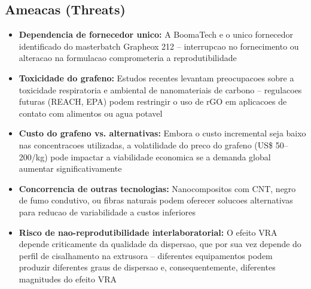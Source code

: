 \documentclass[11pt,a4paper,oneside]{article}
\begin{document}
\subsection{Ameacas (Threats)}
\begin{itemize}[nosep]
    \item {\bfseries Dependencia de fornecedor unico:} A BoomaTech e o unico fornecedor identificado do masterbatch Grapheox 212 -- interrupcao no fornecimento ou alteracao na formulacao comprometeria a reprodutibilidade
    \item {\bfseries Toxicidade do grafeno:} Estudos recentes levantam preocupacoes sobre a toxicidade respiratoria e ambiental de nanomateriais de carbono -- regulacoes futuras (REACH, EPA) podem restringir o uso de rGO em aplicacoes de contato com alimentos ou agua potavel
    \item {\bfseries Custo do grafeno vs. alternativas:} Embora o custo incremental seja baixo nas concentracoes utilizadas, a volatilidade do preco do grafeno (US\$ 50--200/kg) pode impactar a viabilidade economica se a demanda global aumentar significativamente
    \item {\bfseries Concorrencia de outras tecnologias:} Nanocompositos com CNT, negro de fumo condutivo, ou fibras naturais podem oferecer solucoes alternativas para reducao de variabilidade a custos inferiores
    \item {\bfseries Risco de nao-reprodutibilidade interlaboratorial:} O efeito VRA depende criticamente da qualidade da dispersao, que por sua vez depende do perfil de cisalhamento na extrusora -- diferentes equipamentos podem produzir diferentes graus de dispersao e, consequentemente, diferentes magnitudes do efeito VRA
\end{itemize}
\end{document}
